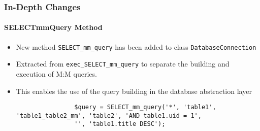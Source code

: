\begin{frame}[fragile]
	\frametitle{In-Depth Changes}
	\framesubtitle{SELECTmmQuery Method}

	\lstset{basicstyle=\tiny\ttfamily}

	\begin{itemize}

		\item New method \texttt{SELECT\_mm\_query} has been added to class \texttt{DatabaseConnection}

		\item Extracted from \texttt{exec\_SELECT\_mm\_query} to separate the building and execution
			of M:M queries.

		\item This enables the use of the query building in the database abstraction layer

			\begin{lstlisting}
				$query = SELECT_mm_query('*', 'table1', 'table1_table2_mm', 'table2', 'AND table1.uid = 1',
				'', 'table1.title DESC');
			\end{lstlisting}

	\end{itemize}

\end{frame}


